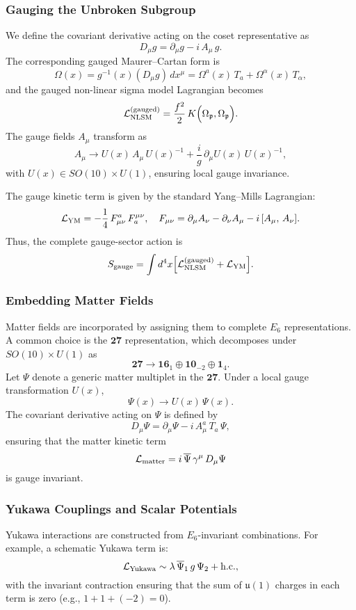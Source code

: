 \documentclass[aps,prd,preprint,groupedaddress]{revtex4-2}
\begin{document}
\subsubsection{Gauging the Unbroken Subgroup}

We define the covariant derivative acting on the coset representative as
\[
D_\mu g = \partial_\mu g - i\,A_\mu\,g.
\]
The corresponding gauged Maurer--Cartan form is
\[
\Omega(x) = g^{-1}(x)(D_\mu g)\,dx^\mu = \Omega^a(x)\,T_a + \Omega^\alpha(x)\,T_\alpha,
\]
and the gauged non-linear sigma model Lagrangian becomes
\[
\mathcal{L}_{\rm NLSM}^{\rm (gauged)} = \frac{f^2}{2}\,K\Bigl(\Omega_{\mathfrak{p}},\Omega_{\mathfrak{p}}\Bigr).
\]
The gauge fields \(A_\mu\) transform as
\[
A_\mu \longrightarrow U(x)\,A_\mu\,U(x)^{-1} + \frac{i}{g}\,\partial_\mu U(x)\,U(x)^{-1},
\]
with \(U(x) \in SO(10)\times U(1)\), ensuring local gauge invariance.

The gauge kinetic term is given by the standard Yang--Mills Lagrangian:
\[
\mathcal{L}_{\rm YM} = -\frac{1}{4}\,F_{\mu\nu}^a\,F_a^{\mu\nu}, \quad F_{\mu\nu} = \partial_\mu A_\nu - \partial_\nu A_\mu - i\,[A_\mu,\,A_\nu].
\]
Thus, the complete gauge-sector action is
\[
S_{\rm gauge} = \int d^4x \Bigl[\mathcal{L}_{\rm NLSM}^{\rm (gauged)} + \mathcal{L}_{\rm YM}\Bigr].
\]

\subsubsection{Embedding Matter Fields}

Matter fields are incorporated by assigning them to complete \(E_6\) representations. A common choice is the \(\mathbf{27}\) representation, which decomposes under \(SO(10)\times U(1)\) as
\[
\mathbf{27} \rightarrow \mathbf{16}_{1} \oplus \mathbf{10}_{-2} \oplus \mathbf{1}_{4}.
\]
Let \(\Psi\) denote a generic matter multiplet in the \(\mathbf{27}\). Under a local gauge transformation \(U(x)\),
\[
\Psi(x) \longrightarrow U(x)\,\Psi(x).
\]
The covariant derivative acting on \(\Psi\) is defined by
\[
D_\mu \Psi = \partial_\mu \Psi - i\,A_\mu^a\,T_a\,\Psi,
\]
ensuring that the matter kinetic term
\[
\mathcal{L}_{\rm matter} = i\,\overline{\Psi}\,\gamma^\mu\,D_\mu\Psi
\]
is gauge invariant.

\subsubsection{Yukawa Couplings and Scalar Potentials}

Yukawa interactions are constructed from \(E_6\)-invariant combinations. For example, a schematic Yukawa term is:
\[
\mathcal{L}_{\rm Yukawa} \sim \lambda\,\overline{\Psi}_1\,g\,\Psi_2 + \text{h.c.},
\]
with the invariant contraction ensuring that the sum of \(\mathfrak{u}(1)\) charges in each term is zero (e.g., \(1+1+(-2)=0\)).
\end{document}
